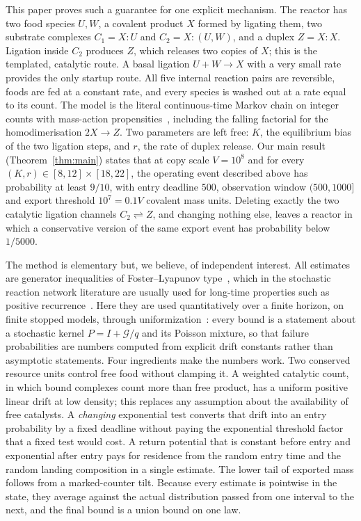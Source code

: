 \documentclass[11pt,a4paper]{article}
\theoremstyle{plain}
\theoremstyle{definition}
\theoremstyle{remark}
\newcommand{\G}{\mathcal G}
\begin{document}
This paper proves such a guarantee for one explicit mechanism. The reactor has two food species $U,W$, a covalent product $X$ formed by ligating them, two substrate complexes $C_1=X{:}U$ and $C_2=X{:}(U,W)$, and a duplex $Z=X{:}X$. Ligation inside $C_2$ produces $Z$, which releases two copies of $X$; this is the templated, catalytic route. A basal ligation $U+W\to X$ with a very small rate provides the only startup route. All five internal reaction pairs are reversible, foods are fed at a constant rate, and every species is washed out at a rate equal to its count. The model is the literal continuous-time Markov chain on integer counts with mass-action propensities~\citep{kurtz1972,gillespie1977,anderson2015}, including the falling factorial for the homodimerisation $2X\to Z$. Two parameters are left free: $K$, the equilibrium bias of the two ligation steps, and $r$, the rate of duplex release. Our main result (Theorem~\ref{thm:main}) states that at copy scale $V=10^8$ and for every $(K,r)\in[8,12]\times[18,22]$, the operating event described above has probability at least $9/10$, with entry deadline $500$, observation window $(500,1000]$ and export threshold $10^7=0.1V$ covalent mass units. Deleting exactly the two catalytic ligation channels $C_2\rightleftharpoons Z$, and changing nothing else, leaves a reactor in which a conservative version of the same export event has probability below $1/5000$.

The method is elementary but, we believe, of independent interest. All estimates are generator inequalities of Foster--Lyapunov type~\citep{meyn1993}, which in the stochastic reaction network literature are usually used for long-time properties such as positive recurrence~\citep{gupta2014,anderson2018}. Here they are used quantitatively over a finite horizon, on finite stopped models, through uniformization~\citep{jensen1953,grassmann1977}: every bound is a statement about a stochastic kernel $P=I+\G/q$ and its Poisson mixture, so that failure probabilities are numbers computed from explicit drift constants rather than asymptotic statements. Four ingredients make the numbers work. Two conserved resource units control free food without clamping it. A weighted catalytic count, in which bound complexes count more than free product, has a uniform positive linear drift at low density; this replaces any assumption about the availability of free catalysts. A \emph{changing} exponential test converts that drift into an entry probability by a fixed deadline without paying the exponential threshold factor that a fixed test would cost. A return potential that is constant before entry and exponential after entry pays for residence from the random entry time and the random landing composition in a single estimate. The lower tail of exported mass follows from a marked-counter tilt. Because every estimate is pointwise in the state, they average against the actual distribution passed from one interval to the next, and the final bound is a union bound on one law.
\end{document}
